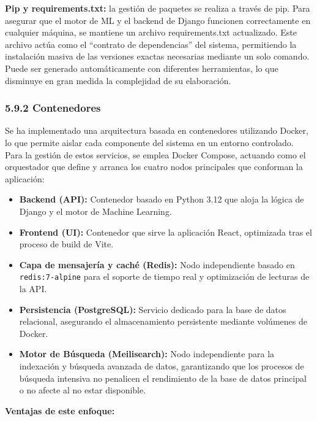 \textbf{Pip y requirements.txt:} la gestión de paquetes se realiza a través de pip. Para asegurar que 
el motor de ML y el backend de Django funcionen correctamente en cualquier máquina, se mantiene un 
archivo requirements.txt actualizado. Este archivo actúa como el ``contrato de dependencias'' del 
sistema, permitiendo la instalación masiva de las versiones exactas necesarias mediante un solo 
comando. Puede ser generado automáticamente con diferentes herramientas, lo que disminuye en gran 
medida la complejidad de su elaboración.

\subsubsection{5.9.2 Contenedores}

Se ha implementado una arquitectura basada en contenedores utilizando Docker, lo que permite aislar 
cada componente del sistema en un entorno controlado. Para la gestión de estos servicios, se emplea 
Docker Compose, actuando como el orquestador que define y arranca los cuatro nodos principales que 
conforman la aplicación:

\begin{itemize}
\item \textbf{Backend (API):} Contenedor basado en Python 3.12 que aloja la lógica de Django y el 
motor de Machine Learning.

\item \textbf{Frontend (UI):} Contenedor que sirve la aplicación React, optimizada tras el proceso 
de build de Vite.

\item \textbf{Capa de mensajería y caché (Redis):} Nodo independiente basado en \texttt{redis:7-alpine} para el soporte de tiempo real y optimización de lecturas de la API.
\item \textbf{Persistencia (PostgreSQL):} Servicio dedicado para la base de datos relacional, 
asegurando el almacenamiento persistente mediante volúmenes de Docker.

\item \textbf{Motor de Búsqueda (Meilisearch):} Nodo independiente para la indexación y búsqueda 
avanzada de datos, garantizando que los procesos de búsqueda intensiva no penalicen el rendimiento 
de la base de datos principal o no afecte al no estar disponible.
\end{itemize}

\textbf{Ventajas de este enfoque:}

